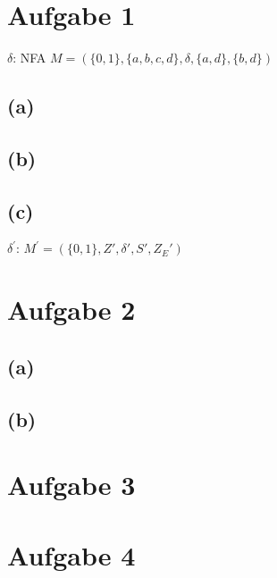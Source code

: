 \documentclass[titlepage]{article}
\renewcommand{\]}{\right]}
\renewcommand{\[}{\left[}
\renewcommand{\)}{\right)}
\renewcommand{\(}{\left(}
\renewcommand{\|}{\;|\;}
\renewcommand{\l}{\linebreak}
\begin{document}
\begingroup\let\clearpage\relax
	
	
	\section*{Aufgabe 1}
		\begin{center}
			$\delta$:\l
			\l
			NFA $M=(\{0,1\},\{a,b,c,d\},\delta,\{a,d\},\{b,d\})$
			
		\end{center}
		\subsection*{(a)}
			
		\subsection*{(b)}
		\subsection*{(c)}
		\begin{center}
			
			$\delta^{'}$:\l
			\l
			$M^{'}=(\{0,1\},Z',\delta',S',Z_E')$
		\end{center}
	\section*{Aufgabe 2}
	\subsection*{(a)}
		\begin{center}
			
		\end{center}
	\subsection*{(b)}
		\begin{center}
			
		\end{center}
	
	\section*{Aufgabe 3}
		\begin{center}
			
		\end{center}
	
	\section*{Aufgabe 4}
		\begin{center}
			
		\end{center}

	\endgroup	
\end{document}
